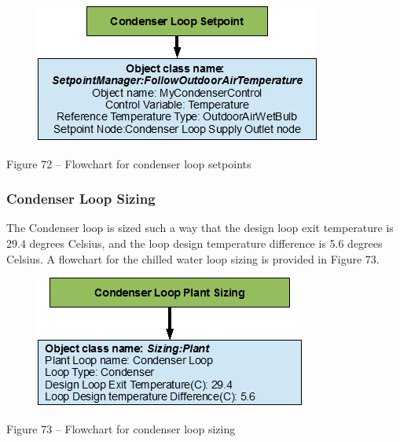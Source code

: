 \begin{figure}[htbp]
\centering
\includegraphics{media/image072.png}
\caption{}
\end{figure}

Figure 72 -- Flowchart for condenser loop setpoints

\subsubsection{Condenser Loop Sizing}\label{condenser-loop-sizing}

The Condenser loop is sized such a way that the design loop exit temperature is 29.4 degrees Celsius, and the loop design temperature difference is 5.6 degrees Celsius. A flowchart for the chilled water loop sizing is provided in Figure 73.

\begin{figure}[htbp]
\centering
\includegraphics{media/image073.png}
\caption{}
\end{figure}

Figure 73 -- Flowchart for condenser loop sizing

